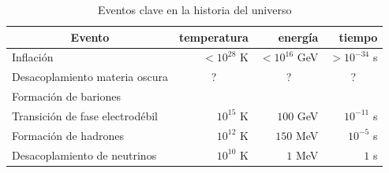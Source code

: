     {\renewcommand{\arraystretch}{1.1}
        \begin{table}[t]
            \centering
            \caption{Eventos clave en la historia del universo}
            \label{tab::eventos}
            \begin{tabular}{lrrr}
                \toprule
                \multicolumn{1}{c}{\textbf{Evento}}               & \textbf{temperatura}                                              & \textbf{energía}                                                  & \textbf{tiempo}                                                   \\ \midrule
                \rowcolor{migris!50}
                {\color[HTML]{FFFFFF} Inflación}                  & {\color[HTML]{FFFFFF} \(<10^{28}\) K}                             & {\color[HTML]{FFFFFF} \(<10^{16}\) GeV}                           & {\color[HTML]{FFFFFF} \(>10^{-34}\) s}                            \\
                Desacoplamiento materia oscura                    & \multicolumn{1}{c}{?}                                             & \multicolumn{1}{c}{?}                                             & \multicolumn{1}{c}{?}                                             \\
                \rowcolor{migris!50}
                {\color[HTML]{FFFFFF} Formación de bariones}      & \multicolumn{1}{c}{\cellcolor{migris!50}{\color[HTML]{FFFFFF} ?}} & \multicolumn{1}{c}{\cellcolor{migris!50}{\color[HTML]{FFFFFF} ?}} & \multicolumn{1}{c}{\cellcolor{migris!50}{\color[HTML]{FFFFFF} ?}} \\
                Transición de fase electrodébil                   & \(10^{15}\) K                                                     & \(100\) GeV                                                       & \(10^{-11}\) s                                                    \\
                \rowcolor{migris!50}
                {\color[HTML]{FFFFFF} Formación de hadrones}      & {\color[HTML]{FFFFFF} \(10^{12}\) K}                              & {\color[HTML]{FFFFFF} \(150\) MeV}                                & {\color[HTML]{FFFFFF} \(10^{-5}\) s}                              \\
                Desacoplamiento de neutrinos                      & \(10^{10}\) K                                                     & \(1\) MeV                                                         & \(1\) s                                                           \\

\end{tabular}
\end{table}}
